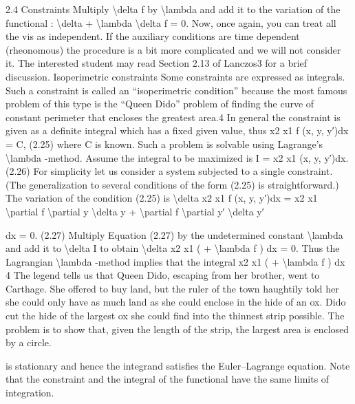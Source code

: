 \begin{example}
2.4
Constraints
Multiply \textbackslash{}delta f by \textbackslash{}lambda  and add it to the variation of the functional :
\textbackslash{}delta  + \textbackslash{}lambda \textbackslash{}delta f = 0.
Now, once again, you can treat all the vis as independent.
If the auxiliary conditions are time dependent (rheonomous) the procedure
is a bit more complicated and we will not consider it. The interested student
may read Section 2.13 of Lanczos3 for a brief discussion.
Isoperimetric constraints
Some constraints are expressed as integrals. Such a constraint is called an
``isoperimetric condition'' because the most famous problem of this type is the
``Queen Dido'' problem of finding the curve of constant perimeter that encloses
the greatest area.4 In general the constraint is given as a definite integral which
has a fixed given value, thus
x2
x1
f (x, y, y′)dx = C,
(2.25)
where C is known. Such a problem is solvable using Lagrange's \textbackslash{}lambda -method.
Assume the integral to be maximized is
I =
x2
x1
(x, y, y′)dx.
(2.26)
For simplicity let us consider a system subjected to a single constraint. (The
generalization to several conditions of the form (2.25) is straightforward.) The
variation of the condition (2.25) is
\textbackslash{}delta
x2
x1
f (x, y, y′)dx =
x2
x1
\textbackslash{}partial f
\textbackslash{}partial y \textbackslash{}delta y + \textbackslash{}partial f
\textbackslash{}partial y′ \textbackslash{}delta y′

dx = 0.
(2.27)
Multiply Equation (2.27) by the undetermined constant \textbackslash{}lambda  and add it to \textbackslash{}delta I to
obtain
\textbackslash{}delta
x2
x1
( + \textbackslash{}lambda f ) dx = 0.
Thus the Lagrangian \textbackslash{}lambda -method implies that the integral
x2
x1
( + \textbackslash{}lambda f ) dx
4 The legend tells us that Queen Dido, escaping from her brother, went to Carthage. She offered
to buy land, but the ruler of the town haughtily told her she could only have as much land as
she could enclose in the hide of an ox. Dido cut the hide of the largest ox she could find into
the thinnest strip possible. The problem is to show that, given the length of the strip, the
largest area is enclosed by a circle.

is stationary and hence the integrand satisfies the Euler--Lagrange equation.
Note that the constraint and the integral of the functional have the same limits
of integration.
\end{example}

